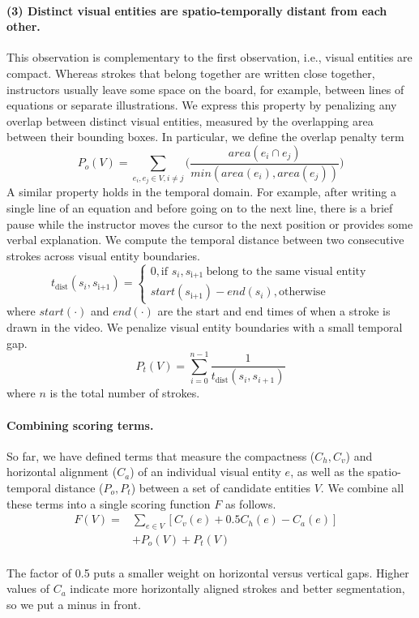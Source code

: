 \paragraph{(3) Distinct visual entities are spatio-temporally distant from each other.} This observation
is complementary to the first observation, i.e., visual entities are
compact. Whereas strokes that belong together are written close
together, instructors usually leave some space on the board, for
example, between lines of equations or separate illustrations. We
express this property by penalizing any overlap between distinct
visual entities, measured by the overlapping
area between their bounding boxes. In particular, we define the overlap
penalty term
\begin{equation}
P_{o}(V) = \sum_{e_i,e_j \in V, i \neq j}\big(\frac{area(e_i\cap e_j)}{min(area(e_i), area(e_j))}\big)
\label{Eq:overlap_penalty}
\end{equation}
A similar property holds in the temporal domain. For example, after
writing a single line of an equation and before going on to the next
line, there is a brief pause while the instructor moves the cursor to
the next position or provides some verbal explanation. We compute the
temporal distance between two consecutive strokes across visual entity
boundaries.
\[
    t_\text{dist}(s_i, s_\text{i+1})= 
\begin{cases}
   0, \text{if } s_i, s_\text{i+1 } \text{belong to the same visual entity}\\
   start(s_\text{i+1}) - end(s_i), \text{otherwise}
\end{cases}
\]
where $start(\cdot)$ and $end(\cdot)$ are the start and end times of
when a stroke is drawn in the video. We penalize visual entity
boundaries with a small temporal gap.
\begin{equation}
P_{t}(V) = \sum_{i = 0}^{n-1}\frac{1}{t_\text{dist}(s_i, s_{i+1})}
\end{equation}
where $n$ is the total number of strokes.\\

\paragraph{Combining scoring terms.} So far, we have defined terms that measure the compactness ($C_h, C_v$) and horizontal alignment ($C_a$) of an individual visual entity $e$, as well as the spatio-temporal distance ($P_o, P_t$) between a set of candidate entities $V$. 
%
We combine all these terms into a single scoring function $F$ as follows.  
\begin{align}
F(V) = &\sum_{e \in V}[C_v(e) + 0.5C_h(e)- C_a(e)]&\\
&+ P_o(V) + P_t(V)
\end{align}\\
The factor of 0.5 puts a smaller weight on horizontal versus vertical
gaps. Higher values of $C_a$ indicate more horizontally aligned strokes and better segmentation, so we put a minus in front.\\

